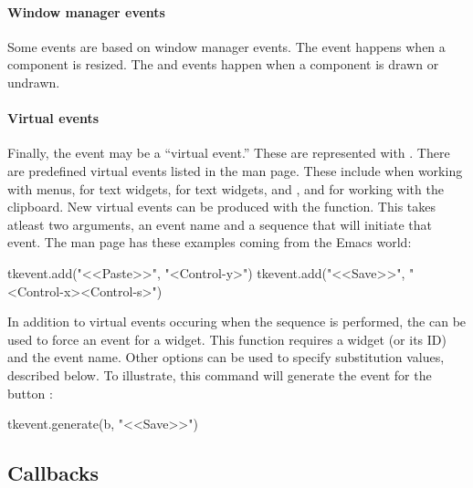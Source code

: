 \paragraph{Window manager events}
Some events are based on window manager events. The 
event happens when a component is resized. The  and
 events happen when a component is drawn or undrawn.

\paragraph{Virtual events}
Finally, the event may be a ``virtual event.'' These are represented
with . There are predefined virtual
events listed in the  man page. These include
 when working with menus,
 for text widgets,
 for text widgets, and
,  and
 for working with the clipboard. New
virtual events can be produced with the 
function. This takes atleast two arguments, an event name and a
sequence that will initiate that event. The  man page has
these examples coming from the Emacs world:
\begin{Schunk}
\begin{Sinput}
  tkevent.add("<<Paste>>", "<Control-y>")
  tkevent.add("<<Save>>", "<Control-x><Control-s>")
\end{Sinput}
\end{Schunk}
%
In addition to virtual events occuring when the sequence is performed,
the  can be used to force an event for a
widget. This function requires a widget (or its ID) and the event
name. Other options can be used to specify substitution values,
described below. To illustrate, this command will generate the
 event for the button :
\begin{Schunk}
\begin{Sinput}
 tkevent.generate(b, "<<Save>>")
\end{Sinput}
\end{Schunk}
%



\subsection{Callbacks}
\label{sec:tcltk:callbacks}

